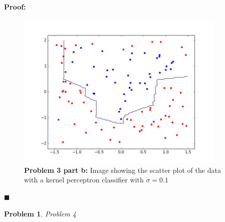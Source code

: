 \documentclass[12pt]{article}
\newenvironment{proof}{\paragraph{Proof: }}{\hfill$\blacksquare$}
\newtheorem{problem}{Problem}%
\begin{document}
\begin{proof}
\begin{figure}[!htbp]
\centering
\includegraphics[width=10cm]{hw3_p3_sigma01.jpg}
\caption{\textbf{Problem 3 part b:} Image showing the scatter plot of the data with a kernel perceptron classifier with $\sigma = 0.1$}
\end{figure}




\end{proof}

\begin{problem}
\normalfont
Problem 4
\end{problem}
\end{document}
